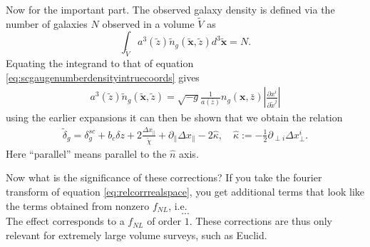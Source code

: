 \documentclass[11pt]{article}
\begin{document}
Now for the important part. The observed galaxy density is defined via the number of galaxies $N$ observed in a volume $\tilde V$ as
\begin{equation}
    \int_{\tilde V}a^3(\tilde z)\tilde n_g(\tilde {\mathbf x}, \tilde z) d^3\tilde{\mathbf x} = N.
\end{equation}
Equating the integrand to that of equation \ref{eq:scgaugenumberdensityintruecoords} gives
\begin{gather}
    a^3(\tilde z)\tilde n_g(\tilde{\mathbf x}, \tilde z) = \sqrt{-g}\frac{1}{a(\bar z)} n_g(\mathbf x, \bar z)\left | \frac{\partial x^i}{\partial\tilde x^j} \right |
\end{gather}
using the earlier expansions it can then be shown that we obtain the relation
\begin{gather}
    \tilde \delta_g = \delta^{sc}_g + b_c\delta z + 2\frac{\Delta x_\parallel}{\tilde \chi} + \partial_{\parallel}\Delta x_\parallel - 2\hat \kappa, \quad \hat \kappa := -\frac{1}{2}\partial_{\perp i}\Delta x^i_{\perp}.
    \label{eq:relcorrrealspace}
\end{gather}
Here ``parallel'' means parallel to the $\hat n$ axis.

Now what is the significance of these corrections? If you take the fourier transform of equation \ref{eq:relcorrrealspace}, you get additional terms that look like the terms obtained from nonzero $f_{NL}$, i.e.
\begin{equation}
    ...
\end{equation}
The effect corresponds to a $f_{NL}$ of order $1$. These corrections are thus only relevant for extremely large volume surveys, such as Euclid.


\printbibliography
\end{document}

